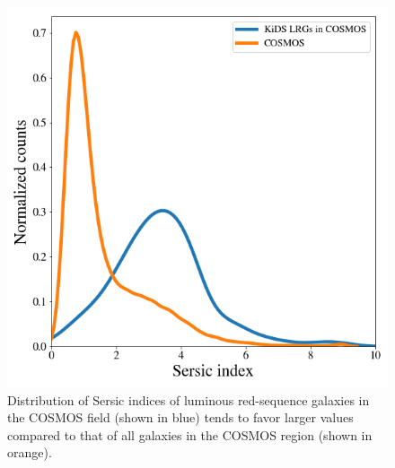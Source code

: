 \documentclass[fleqn,usenatbib,useAMS]{mnras}
\begin{document}
\begin{figure}
\includegraphics[width=\columnwidth]{figures_tmp/cosmos_sersic.png}
\caption{\label{fig:cosmos_sersic}Distribution of Sersic indices of luminous red-sequence galaxies in the COSMOS field (shown in blue) tends to favor larger values compared to that of all galaxies in the COSMOS region (shown in orange).}
\end{figure}
\end{document}
